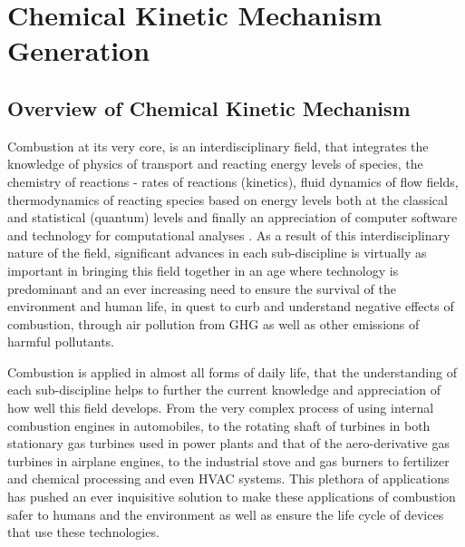 \chapter{Chemical Kinetic Mechanism Generation}
\section{Overview of Chemical Kinetic Mechanism}
Combustion at its very core, is an interdisciplinary field, that integrates the knowledge of physics of transport and reacting energy levels of species, the chemistry of reactions - rates of reactions (kinetics), fluid dynamics of flow fields, thermodynamics of reacting species based on energy levels both at the classical and statistical (quantum) levels and finally an appreciation of computer software and technology for computational analyses \cite{Curran2019DevelopingCombustion}. As a result of this interdisciplinary nature of the field, significant advances in each sub-discipline is virtually as important in bringing this field together in an age where technology is predominant and an ever increasing need to ensure the survival of the environment and human life, in quest to curb and understand negative effects of combustion, through air pollution from GHG as well as other emissions of harmful pollutants. 

Combustion is applied in almost all forms of daily life, that the understanding of each sub-discipline helps to further the current knowledge and appreciation of how well this field develops. From the very complex process of using internal combustion engines in automobiles, to the rotating shaft of turbines in both stationary gas turbines used in power plants and that of the aero-derivative gas turbines in airplane engines, to the industrial stove and gas burners to fertilizer and chemical processing and even HVAC systems. This plethora of applications has pushed an ever inquisitive solution to make these applications of combustion safer to humans and the environment as well as ensure the life cycle of devices that use these technologies. 

